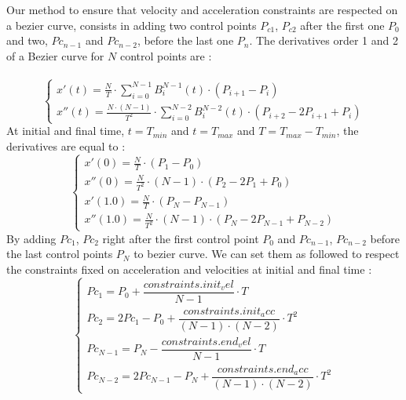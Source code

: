\documentclass{article}
\begin{document}
    
    Our method to ensure that velocity and acceleration constraints are respected on a bezier curve, consists in adding two control points $P_{c1}$, $P_{c2}$ after the first one $P_0$ and two, $Pc_{n-1}$ and $Pc_{n-2}$, before the last one $P_n$. The derivatives order 1 and 2 of a Bezier curve for $N$ control points are :\\\\
    \begin{equation}
    \begin{cases}
    x'(t) = \frac{N}{T} \cdot \sum_{i=0}^{N-1} B_i^{N-1}(t) \cdot (P_{i+1}-P_i)\\
    x''(t) = \frac{N\cdot (N-1)}{T^2} \cdot \sum_{i=0}^{N-2} B_i^{N-2}(t) \cdot (P_{i+2} - 2 P_{i+1} + P_i)
    \end{cases}
    \end{equation}
    At initial and final time, $t=T_{min}$ and $t=T_{max}$ and $T=T_{max}-T_{min}$, the derivatives are equal to :\\
    \begin{equation}
    \begin{cases}
    x'(0) = \frac{N}{T} \cdot (P_1-P_0)\\
    x''(0) = \frac{N}{T^2} \cdot(N-1) \cdot (P_2 - 2 P_1 + P_0)\\
    x'(1.0) = \frac{N}{T} \cdot (P_N-P_{N-1})\\
    x''(1.0) = \frac{N}{T^2} \cdot (N-1) \cdot (P_N - 2 P_{N-1} + P_{N-2})
    \end{cases}
    \end{equation}
    By adding $Pc_{1}$, $Pc_{2}$ right after the first control point $P_0$ and $Pc_{n-1}$, $Pc_{n-2}$ before the last control points $P_N$ to bezier curve. We can set them as followed to respect the constraints fixed on acceleration and velocities at initial and final time :\\
    
    \begin{equation}
    \begin{cases}
    Pc_1 = P_0 + \dfrac{constraints.init_vel}{N-1} \cdot T\\
    Pc_2 = 2 Pc_1 - P_0 + \dfrac{constraints.init_acc}{(N-1) \cdot (N-2)}  \cdot T^2\\
    Pc_{N-1} = P_N - \dfrac{constraints.end_vel}{N-1}  \cdot T\\
    Pc_{N-2} = 2 Pc_{N-1} - P_N + \dfrac{constraints.end_acc}{(N-1) \cdot (N-2)}  \cdot T^2
    \end{cases}
    \end{equation}
    
\end{document}
